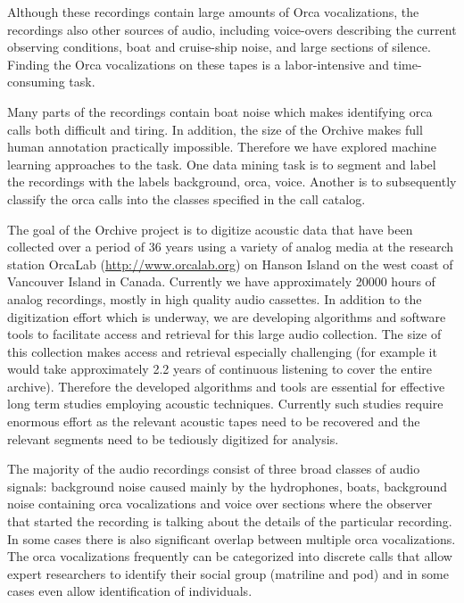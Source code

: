 \documentclass[12pt,oneside]{book}
\begin{document}
Although these recordings contain large amounts of Orca vocalizations,
the recordings also other sources of audio, including voice-overs
describing the current observing conditions, boat and cruise-ship
noise, and large sections of silence.  Finding the Orca vocalizations
on these tapes is a labor-intensive and time-consuming task.

Many parts of the recordings contain boat noise which makes
identifying orca calls both difficult and tiring. In addition, the
size of the Orchive makes full human annotation practically
impossible. Therefore we have explored machine learning approaches to
the task. One data mining task is to segment and label the recordings
with the labels background, orca, voice. Another is to subsequently
classify the orca calls into the classes specified in the call
catalog.

The goal of the Orchive project is to digitize acoustic data that have
been collected over a period of 36 years using a variety of analog
media at the research station OrcaLab (\url{http://www.orcalab.org})
on Hanson Island on the west coast of Vancouver Island in
Canada. Currently we have approximately 20000 hours of analog
recordings, mostly in high quality audio cassettes. In addition to the
digitization effort which is underway, we are developing algorithms
and software tools to facilitate access and retrieval for this large
audio collection.  The size of this collection makes access and
retrieval especially challenging (for example it would take
approximately 2.2 years of continuous listening to cover the entire
archive).  Therefore the developed algorithms and tools are essential
for effective long term studies employing acoustic
techniques. Currently such studies require enormous effort as the
relevant acoustic tapes need to be recovered and the relevant segments
need to be tediously digitized for analysis.

The majority of the audio recordings consist of three broad classes of
audio signals: background noise caused mainly by the hydrophones,
boats, background noise containing orca vocalizations and voice over
sections where the observer that started the recording is talking
about the details of the particular recording. In some cases there is
also significant overlap between multiple orca vocalizations. The orca
vocalizations frequently can be categorized into discrete calls
\cite{ford89} \cite{ford91} that allow expert researchers to identify
their social group (matriline and pod) and in some cases even allow
identification of individuals.
\end{document}
